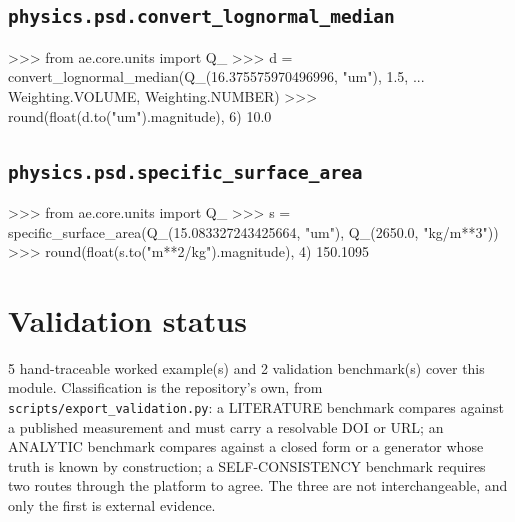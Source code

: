 \documentclass[10pt,a4paper,twoside]{report}
\begin{document}
\subsection*{\texttt{physics.psd.convert\_lognormal\_median}}

\begin{doctestblock}
>>> from ae.core.units import Q_
>>> d = convert_lognormal_median(Q_(16.375575970496996, "um"), 1.5,
...                              Weighting.VOLUME, Weighting.NUMBER)
>>> round(float(d.to("um").magnitude), 6)
10.0
\end{doctestblock}

\subsection*{\texttt{physics.psd.specific\_surface\_area}}

\begin{doctestblock}
>>> from ae.core.units import Q_
>>> s = specific_surface_area(Q_(15.083327243425664, "um"), Q_(2650.0, "kg/m**3"))
>>> round(float(s.to("m**2/kg").magnitude), 4)
150.1095
\end{doctestblock}

\section{Validation status}

5 hand-traceable worked example(s) and 2 validation benchmark(s) cover this module. Classification is the repository's own, from \texttt{scripts/export\_validation.py}: a LITERATURE benchmark compares against a published measurement and must carry a resolvable DOI or URL; an ANALYTIC benchmark compares against a closed form or a generator whose truth is known by construction; a SELF-CONSISTENCY benchmark requires two routes through the platform to agree. The three are not interchangeable, and only the first is external evidence.

\footnotesize
\end{document}
